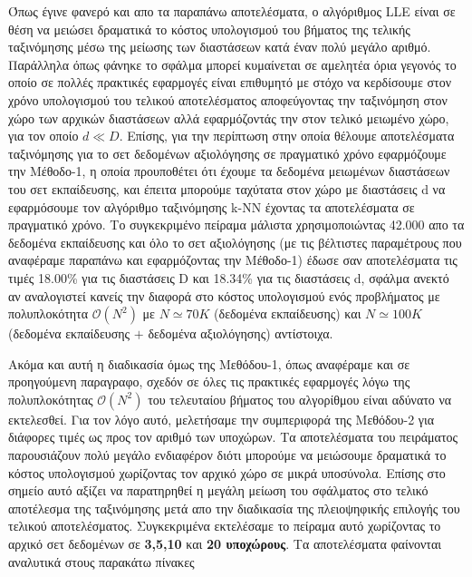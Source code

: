\par
Όπως έγινε φανερό και απο τα παραπάνω αποτελέσματα, ο αλγόριθμος \textlatin{LLE} είναι σε θέση να μειώσει δραματικά το κόστος υπολογισμού του βήματος της τελικής ταξινόμησης μέσω της μείωσης των διαστάσεων κατά έναν πολύ μεγάλο αριθμό. Παράλληλα όπως φάνηκε το σφάλμα μπορεί κυμαίνεται σε αμελητέα όρια γεγονός το οποίο σε πολλές πρακτικές εφαρμογές είναι επιθυμητό με στόχο να κερδίσουμε στον χρόνο υπολογισμού του τελικού αποτελέσματος αποφεύγοντας την ταξινόμηση στον χώρο των αρχικών διαστάσεων αλλά εφαρμόζοντάς την στον τελικό μειωμένο χώρο, για τον οποίο $d \ll D$. Επίσης, για την περίπτωση στην οποία θέλουμε αποτελέσματα ταξινόμησης για το σετ δεδομένων αξιολόγησης σε πραγματικό χρόνο εφαρμόζουμε την Μέθοδο-1, η οποία προυποθέτει ότι έχουμε τα δεδομένα μειωμένων διαστάσεων του σετ εκπαίδευσης, και έπειτα μπορούμε ταχύτατα στον χώρο με διαστάσεις \textlatin{d} να εφαρμόσουμε τον αλγόριθμο ταξινόμησης \textlatin{k-NN} έχοντας τα αποτελέσματα σε πραγματικό χρόνο. Το συγκεκριμένο πείραμα μάλιστα χρησιμοποιώντας 42.000 απο τα δεδομένα εκπαίδευσης και όλο το σετ αξιολόγησης (με τις βέλτιστες παραμέτρους που αναφέραμε παραπάνω και εφαρμόζοντας την Μέθοδο-1) έδωσε σαν αποτελέσματα τις τιμές 18.00\% για τις διαστάσεις \textlatin{D} και 18.34\% για τις διαστάσεις \textlatin{d}, σφάλμα ανεκτό αν αναλογιστεί κανείς την διαφορά στο κόστος υπολογισμού ενός προβλήματος με πολυπλοκότητα $ \mathcal{O}(N^2)$ με $N \simeq 70K$ (δεδομένα εκπαίδευσης) και $N \simeq 100K$ (δεδομένα εκπαίδευσης $+$ δεδομένα αξιολόγησης) αντίστοιχα.
\par
Ακόμα και αυτή η διαδικασία όμως της Μεθόδου-1, όπως αναφέραμε και σε προηγούμενη παραγραφο, σχεδόν σε όλες τις πρακτικές εφαρμογές λόγω της πολυπλοκότητας $ \mathcal{O}(N^2)$  του τελευταίου βήματος του αλγορίθμου είναι αδύνατο να εκτελεσθεί. Για τον λόγο αυτό, μελετήσαμε την συμπεριφορά της Μεθόδου-2 για διάφορες τιμές ως προς τον αριθμό των υποχώρων. Τα αποτελέσματα του πειράματος παρουσιάζουν πολύ μεγάλο ενδιαφέρον διότι μπορούμε να μειώσουμε δραματικά το κόστος υπολογισμού χωρίζοντας τον αρχικό χώρο σε μικρά υποσύνολα. Επίσης στο σημείο αυτό αξίζει να παρατηρηθεί η μεγάλη μείωση του σφάλματος στο τελικό αποτέλεσμα της ταξινόμησης μετά απο την διαδικασία της πλειοψηφικής επιλογής του τελικού αποτελέσματος. Συγκεκριμένα εκτελέσαμε το πείραμα αυτό χωρίζοντας το αρχικό σετ δεδομένων σε \textbf{3,5,10} και \textbf{20 υποχώρους}. Τα αποτελέσματα φαίνονται αναλυτικά στους παρακάτω πίνακες

